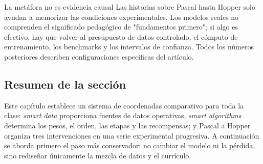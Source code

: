 \begin{warningbox}{La metáfora no es evidencia causal}
Las historias sobre Pascal hasta Hopper solo ayudan a memorizar las condiciones experimentales. Los modelos reales no comprenden el significado pedagógico de "fundamentos primero"; si algo es efectivo, hay que volver al presupuesto de datos controlado, el cómputo de entrenamiento, los benchmarks y los intervalos de confianza. Todos los números posteriores describen configuraciones específicas del artículo.
\end{warningbox}

\subsection{Resumen de la sección}

Este capítulo establece un sistema de coordenadas comparativo para toda la clase: \textit{smart data} proporciona fuentes de datos operativas, \textit{smart algorithms} determina los pesos, el orden, las etapas y las recompensas; y Pascal a Hopper organiza tres intervenciones en una serie experimental progresiva. A continuación se aborda primero el paso más conservador: no cambiar el modelo ni la pérdida, sino rediseñar únicamente la mezcla de datos y el currículo.
